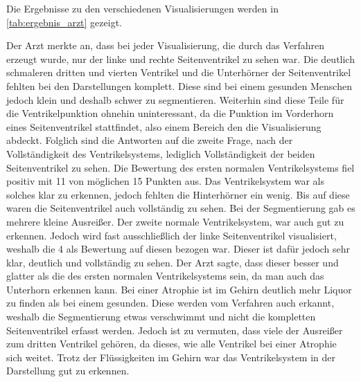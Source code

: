 Die Ergebnisse zu den verschiedenen Visualisierungen werden in \autoref{tab:ergebnis_arzt} gezeigt.

\begin{table}[h]
\centering
{}
\caption{Ergebnisse des Interviews mit einem Arzt}
\label{tab:ergebnis_arzt}
\end{table}



Der Arzt merkte an, dass bei jeder Visualisierung, die durch das Verfahren erzeugt wurde, nur der linke und rechte Seitenventrikel zu sehen war. Die deutlich schmaleren dritten und vierten Ventrikel und die Unterhörner der Seitenventrikel fehlten bei den Darstellungen komplett. Diese sind bei einem gesunden Menschen jedoch klein und deshalb schwer zu segmentieren. Weiterhin sind diese Teile für die Ventrikelpunktion ohnehin uninteressant, da die Punktion im Vorderhorn eines Seitenventrikel stattfindet, also einem Bereich den die Visualisierung abdeckt. Folglich sind die Antworten auf die zweite Frage, nach der Vollständigkeit des Ventrikelsystems, lediglich Vollständigkeit der beiden Seitenventrikel zu sehen.
\newline
Die Bewertung des ersten normalen Ventrikelsystems fiel positiv mit 11 von möglichen 15 Punkten aus. Das Ventrikelsystem war als solches klar zu erkennen, jedoch fehlten die Hinterhörner ein wenig. Bis auf diese waren die Seitenventrikel auch vollständig zu sehen. Bei der Segmentierung gab es mehrere kleine Ausreißer.
\newline
Der zweite normale Ventrikelsystem, war auch gut zu erkennen. Jedoch wird fast ausschließlich der linke Seitenventrikel visualisiert, weshalb die 4 als Bewertung auf diesen bezogen war. Dieser ist dafür jedoch sehr klar, deutlich und vollständig zu sehen. Der Arzt sagte, dass dieser besser und glatter als die des ersten normalen Ventrikelsystems sein, da man auch das Unterhorn erkennen kann. 
\newline
Bei einer Atrophie ist im Gehirn deutlich mehr Liquor zu finden als bei einem gesunden. Diese werden vom Verfahren auch erkannt, weshalb die Segmentierung etwas verschwimmt und nicht die kompletten Seitenventrikel erfasst werden. Jedoch ist zu vermuten, dass viele der Ausreißer zum dritten Ventrikel gehören, da dieses, wie alle Ventrikel bei einer Atrophie sich weitet. Trotz der Flüssigkeiten im Gehirn war das Ventrikelsystem in der Darstellung gut zu erkennen.
\newline




